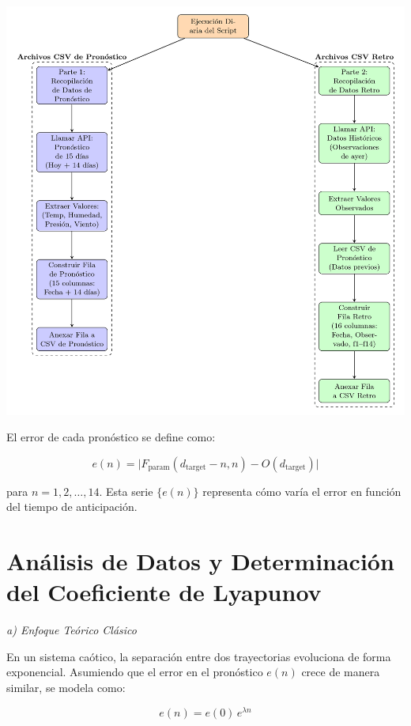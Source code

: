 \documentclass[
  10pt,
  a4paper,
  DIV=11,
  numbers=noendperiod,
  open=any]{scrreprt}
\numberwithin{equation}{chapter}
\numberwithin{equation}{section}
\renewcommand{\[}{\begin{equation}}
\renewcommand{\]}{\end{equation}}
\begin{document}
\includegraphics[width=1\linewidth,height=\textheight,keepaspectratio]{03-meteorologia/EjecucionDiaria.png}

El error de cada pronóstico se define como:

\begin{equation}
e(n) = \bigl| F_{\text{param}}(d_{\text{target}}-n, n) - O(d_{\text{target}}) \bigr|
\end{equation}

para \(n = 1,2,\dots,14\). Esta serie \(\{e(n)\}\) representa cómo varía
el error en función del tiempo de anticipación.

\section{Análisis de Datos y Determinación del Coeficiente de
Lyapunov}\label{anuxe1lisis-de-datos-y-determinaciuxf3n-del-coeficiente-de-lyapunov}

\emph{a) Enfoque Teórico Clásico}

En un sistema caótico, la separación entre dos trayectorias evoluciona
de forma exponencial. Asumiendo que el error en el pronóstico \(e(n)\)
crece de manera similar, se modela como:

\begin{equation}
e(n) = e(0)\, e^{\lambda n}
\end{equation}
\end{document}
